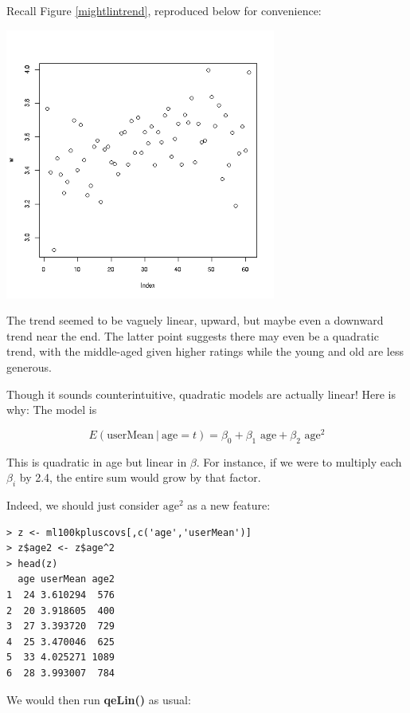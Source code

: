 Recall Figure \ref{mightlintrend}, reproduced below for convenience:

\includegraphics[width=3.5in]{Images/MeanRatVsAge.png}

The trend seemed to be vaguely linear, upward, but maybe even a downward
trend near the end.  The latter point suggests there may even be a
quadratic trend, with the middle-aged given higher ratings while the
young and old are less generous.

Though it sounds counterintuitive, quadratic models are actually linear!
Here is why:  The model is

\begin{equation}
\label{firstquad}
E( \textrm{userMean} ~|~ \textrm{age} = t) =
\beta_0 + \beta_1 \textrm{ age} + \beta_2 \textrm{ age}^2
\end{equation}

This is quadratic in age but linear in $\beta$.  For instance, if we
were to multiply each $\beta_i$ by 2.4, the entire sum would grow by
that factor.

Indeed, we should just consider $\textrm{age}^2$ as a new feature:

\begin{lstlisting}
> z <- ml100kpluscovs[,c('age','userMean')] 
> z$age2 <- z$age^2
> head(z)
  age userMean age2
1  24 3.610294  576
2  20 3.918605  400
3  27 3.393720  729
4  25 3.470046  625
5  33 4.025271 1089
6  28 3.993007  784
\end{lstlisting}

We would then run \textbf{qeLin()} as usual:

